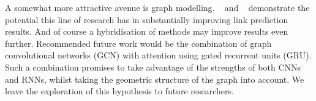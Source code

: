 \noindent A somewhat more attractive avenue is graph modelling.  ~\citep{nathani2019learning} and ~\citep{pinter-eisenstein-2018-predicting} demonstrate the potential this line of research has in substantially improving link prediction results. And of course a hybridisation of methods may improve results even further. Recommended future work would be the combination of graph convolutional networks (GCN) with attention using gated recurrent units (GRU). Such a combination promises to take advantage of the strengths of both CNNs and RNNs, whilst taking the geometric structure of the graph into account. We leave the exploration of this hypothesis to future researchers.
